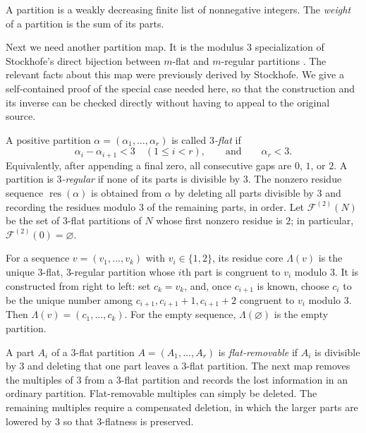 \documentclass[11pt]{amsart}
\theoremstyle{definition}
\theoremstyle{remark}
\newcommand{\F}{\mathcal F}
\newcommand{\res}{\operatorname{res}}
\begin{document}
A partition is a weakly decreasing finite list of nonnegative integers.  The \emph{weight} of a partition is the sum of its parts.

Next we need another partition map.  It is the modulus $3$ specialization of Stockhofe's direct bijection between $m$-flat and $m$-regular partitions \cite{Stockhofe}.  The relevant facts about this map were previously derived by Stockhofe.  We give a self-contained proof of the special case needed here, so that the construction and its inverse can be checked directly without having to appeal to the original source.

A positive partition $\alpha=(\alpha_1,\ldots,\alpha_r)$ is called \emph{$3$-flat} if
\[
        \alpha_i-\alpha_{i+1}<3\quad(1\le i<r),
        \qquad\text{and}\qquad
        \alpha_r<3.
\]
Equivalently, after appending a final zero, all consecutive gaps are $0$, $1$, or $2$.  A partition is \emph{$3$-regular} if none of its parts is divisible by $3$.  The nonzero residue sequence $\res(\alpha)$ is obtained from $\alpha$ by deleting all parts divisible by $3$ and recording the residues modulo $3$ of the remaining parts, in order.  Let $\F^{(2)}(N)$ be the set of $3$-flat partitions of $N$ whose first nonzero residue is $2$; in particular, $\F^{(2)}(0)=\varnothing$.

For a sequence $v=(v_1,\ldots,v_k)$ with $v_i\in\{1,2\}$, its residue core $\Lambda(v)$ is the unique $3$-flat, $3$-regular partition whose $i$th part is congruent to $v_i$ modulo $3$.  It is constructed from right to left: set $c_k=v_k$, and, once $c_{i+1}$ is known, choose $c_i$ to be the unique number among $c_{i+1},c_{i+1}+1,c_{i+1}+2$ congruent to $v_i$ modulo $3$.  Then $\Lambda(v)=(c_1,\ldots,c_k)$.  For the empty sequence, $\Lambda(\varnothing)$ is the empty partition.

A part $A_i$ of a $3$-flat partition $A=(A_1,\ldots,A_r)$ is \emph{flat-removable} if $A_i$ is divisible by $3$ and deleting that one part leaves a $3$-flat partition.  The next map removes the multiples of $3$ from a $3$-flat partition and records the lost information in an ordinary partition.  Flat-removable multiples can simply be deleted.  The remaining multiples require a compensated deletion, in which the larger parts are lowered by $3$ so that $3$-flatness is preserved.
\end{document}

